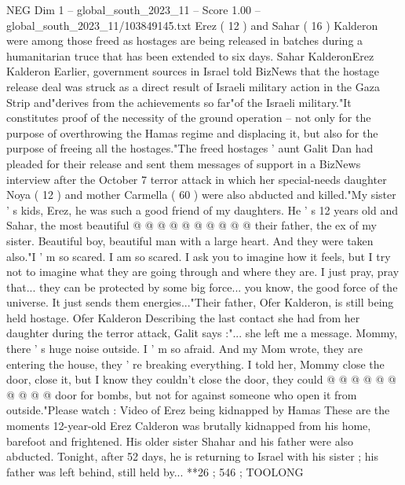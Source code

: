 \begin{textsample}{NEG Dim 1 – global\_south\_2023\_11 – Score 1.00 – global\_south\_2023\_11/103849145.txt}  \label{ex:f1_neg_231}
Erez ( 12 ) and Sahar ( 16 ) Kalderon were among those freed as hostages are being released in batches during a humanitarian truce that has been extended to six days.
Sahar KalderonErez Kalderon Earlier, government sources in Israel told BizNews that the hostage release deal was struck as a direct result of Israeli military action in the Gaza Strip and"derives from the achievements so far"of the Israeli military."It constitutes proof of the necessity of the ground operation -- not only for the purpose of overthrowing the Hamas regime and displacing it, but also for the purpose of freeing all the hostages."The freed hostages ' aunt Galit Dan had pleaded for their release and sent them messages of support in a BizNews interview after the October 7 terror attack in which her special-needs daughter Noya ( 12 ) and mother Carmella ( 60 ) were also abducted and killed."My sister ' s kids, Erez, he was such a good friend of my daughters.
He ' s 12 years old and Sahar, the most beautiful @ @ @ @ @ @ @ @ @ @ their father, the ex of my sister.
Beautiful boy, beautiful man with a large heart.
And they were taken also."I ' m so scared.
I am so scared.
I ask you to imagine how it feels, but I try not to imagine what they are going through and where they are.
I just pray, pray that... they can be protected by some big force... you know, the good force of the universe.
It just sends them energies..."Their father, Ofer Kalderon, is still being held hostage.
Ofer Kalderon Describing the last contact she had from her daughter during the terror attack, Galit says :"... she left me a message.
Mommy, there ' s huge noise outside.
I ' m so afraid.
And my Mom wrote, they are entering the house, they ' re breaking everything.
I told her, Mommy close the door, close it, but I know they couldn't close the door, they could @ @ @ @ @ @ @ @ @ @ door for bombs, but not for against someone who open it from outside."Please watch : Video of Erez being kidnapped by Hamas These are the moments 12-year-old Erez Calderon was brutally kidnapped from his home, barefoot and frightened.
His older sister Shahar and his father were also abducted.
Tonight, after 52 days, he is returning to Israel with his sister ; his father was left behind, still held by... **26 ; 546 ; TOOLONG

\end{textsample}
